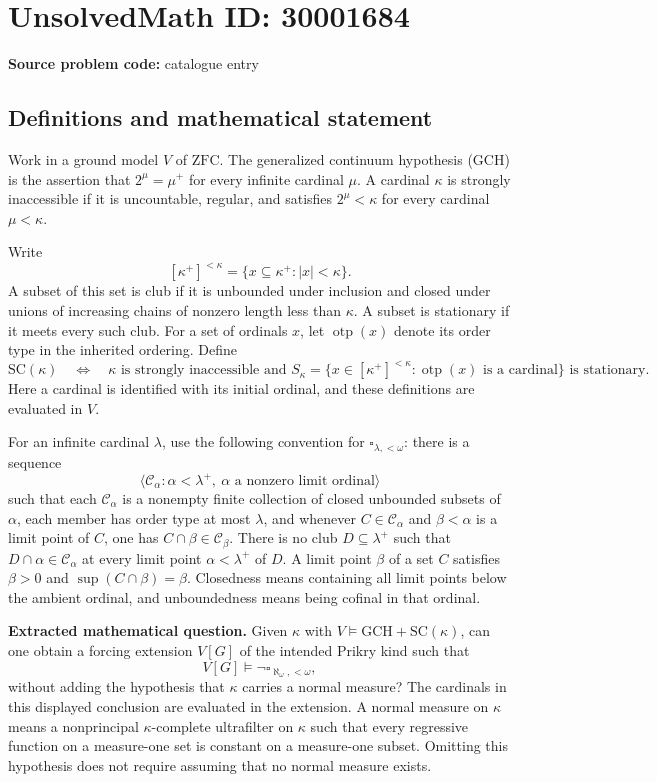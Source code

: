 \documentclass[11pt]{article}
\begin{document}
\section*{UnsolvedMath ID: 30001684}
\textbf{Source problem code:} catalogue entry
\subsection{Definitions and mathematical statement}
Work in a ground model \(V\) of \(\mathrm{ZFC}\). The generalized continuum hypothesis (GCH) is the assertion that \(2^\mu=\mu^+\) for every infinite cardinal \(\mu\). A cardinal \(\kappa\) is strongly inaccessible if it is uncountable, regular, and satisfies \(2^\mu<\kappa\) for every cardinal \(\mu<\kappa\).

Write
\[
[\kappa^+]^{<\kappa}=\{x\subseteq\kappa^+:|x|<\kappa\}.
\]
A subset of this set is club if it is unbounded under inclusion and closed under unions of increasing chains of nonzero length less than \(\kappa\). A subset is stationary if it meets every such club. For a set of ordinals \(x\), let \(\operatorname{otp}(x)\) denote its order type in the inherited ordering. Define
\[
\mathrm{SC}(\kappa)\quad\Longleftrightarrow\quad
\kappa\text{ is strongly inaccessible and }
S_\kappa=\{x\in[\kappa^+]^{<\kappa}:\operatorname{otp}(x)\text{ is a cardinal}\}
\text{ is stationary}.
\]
Here a cardinal is identified with its initial ordinal, and these definitions are evaluated in \(V\).

For an infinite cardinal \(\lambda\), use the following convention for \(\square_{\lambda,<\omega}\): there is a sequence
\[
\langle\mathcal C_\alpha:\alpha<\lambda^+,\ \alpha\text{ a nonzero limit ordinal}\rangle
\]
such that each \(\mathcal C_\alpha\) is a nonempty finite collection of closed unbounded subsets of \(\alpha\), each member has order type at most \(\lambda\), and whenever \(C\in\mathcal C_\alpha\) and \(\beta<\alpha\) is a limit point of \(C\), one has \(C\cap\beta\in\mathcal C_\beta\). There is no club \(D\subseteq\lambda^+\) such that \(D\cap\alpha\in\mathcal C_\alpha\) at every limit point \(\alpha<\lambda^+\) of \(D\). A limit point \(\beta\) of a set \(C\) satisfies \(\beta>0\) and \(\sup(C\cap\beta)=\beta\). Closedness means containing all limit points below the ambient ordinal, and unboundedness means being cofinal in that ordinal.

\textbf{Extracted mathematical question.} Given \(\kappa\) with \(V\models\mathrm{GCH}+\mathrm{SC}(\kappa)\), can one obtain a forcing extension \(V[G]\) of the intended Prikry kind such that
\[
V[G]\models\neg\square_{\aleph_\omega,<\omega},
\]
without adding the hypothesis that \(\kappa\) carries a normal measure? The cardinals in this displayed conclusion are evaluated in the extension. A normal measure on \(\kappa\) means a nonprincipal \(\kappa\)-complete ultrafilter on \(\kappa\) such that every regressive function on a measure-one set is constant on a measure-one subset. Omitting this hypothesis does not require assuming that no normal measure exists.
\end{document}
